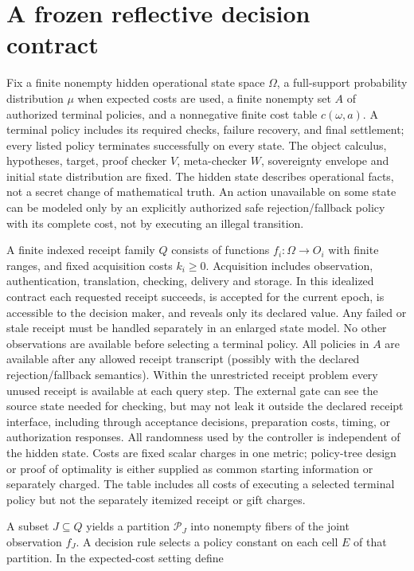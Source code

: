 \documentclass[11pt,letterpaper]{article}
\begin{document}
\section{A frozen reflective decision contract}
\begin{definition}\label{def:contract}
Fix a finite nonempty hidden operational state space $\Omega$, a full-support probability distribution $\mu$ when expected costs are used, a finite nonempty set $A$ of authorized terminal policies, and a nonnegative finite cost table $c(\omega,a)$. A terminal policy includes its required checks, failure recovery, and final settlement; every listed policy terminates successfully on every state. The object calculus, hypotheses, target, proof checker $V$, meta-checker $W$, sovereignty envelope and initial state distribution are fixed. The hidden state describes operational facts, not a secret change of mathematical truth. An action unavailable on some state can be modeled only by an explicitly authorized safe rejection/fallback policy with its complete cost, not by executing an illegal transition.

A finite indexed receipt family $Q$ consists of functions $f_i:\Omega\to O_i$ with finite ranges, and fixed acquisition costs $k_i\ge0$. Acquisition includes observation, authentication, translation, checking, delivery and storage. In this idealized contract each requested receipt succeeds, is accepted for the current epoch, is accessible to the decision maker, and reveals only its declared value. Any failed or stale receipt must be handled separately in an enlarged state model. No other observations are available before selecting a terminal policy. All policies in $A$ are available after any allowed receipt transcript (possibly with the declared rejection/fallback semantics). Within the unrestricted receipt problem every unused receipt is available at each query step. The external gate can see the source state needed for checking, but may not leak it outside the declared receipt interface, including through acceptance decisions, preparation costs, timing, or authorization responses. All randomness used by the controller is independent of the hidden state. Costs are fixed scalar charges in one metric; policy-tree design or proof of optimality is either supplied as common starting information or separately charged. The table includes all costs of executing a selected terminal policy but not the separately itemized receipt or gift charges.
\end{definition}
A subset $J\subseteq Q$ yields a partition $\mathcal P_J$ into nonempty fibers of the joint observation $f_J$. A decision rule selects a policy constant on each cell $E$ of that partition. In the expected-cost setting define
\end{document}
